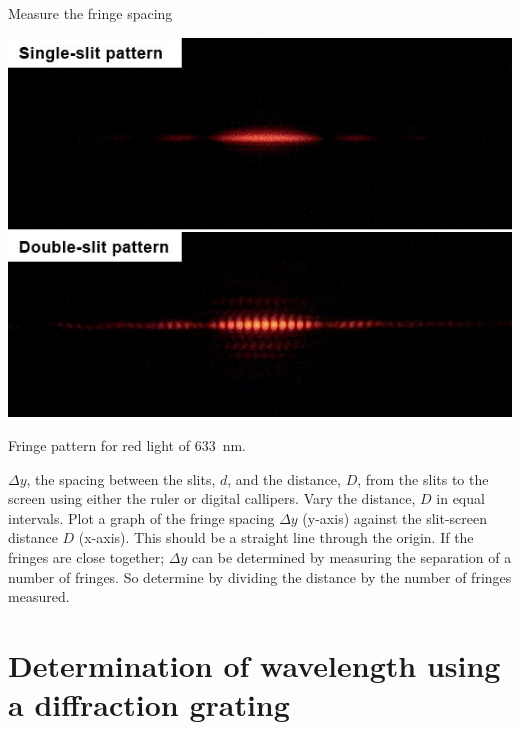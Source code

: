\documentclass{tufte-handout}
\begin{document}
Measure the fringe spacing
\begin{marginfigure}
\includegraphics[]{singledouble.jpg}
\caption{Fringe pattern for red light of \SI{633}{nm}.}
\end{marginfigure} $\Delta y$, the spacing between the slits, $d$, and the distance, $D$, from the slits to the screen using either the ruler or digital callipers.  Vary the distance, $D$ in equal intervals. Plot a graph of the fringe spacing $\Delta y$ (y-axis) against the slit-screen distance $D$  (x-axis). This should be a straight line through the origin.  
If the fringes are close together; $\Delta y$ can be determined by measuring the separation of a number of fringes. So determine by dividing the distance by the number of fringes measured.   
\section{Determination of wavelength using a diffraction grating}
\end{document}

